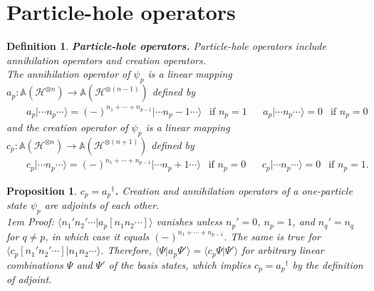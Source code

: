 \documentclass[11pt,fleqn]{article}
\newcommand{\y}{\psi}        %
\newcommand{\Y}{\Psi}        %
\newcommand{\dg}{\ensuremath{^\dagger}}
\newcommand{\cd}{\ensuremath{\cdots}}
\newcommand{\bmit}[1]{{\bfseries\itshape\mathversion{bold}#1}}
\newcommand{\mc}[1]{\ensuremath{\mathcal{#1}}}
\newcommand{\mb}[1]{\ensuremath{\mathbb{#1}}}
\newcommand{\kt}[1]{\ensuremath{|#1\rangle}}
\newcommand{\ip}[1]{\ensuremath{\langle#1\rangle}}
\theoremstyle{mystyle}
\newtheorem{dfn}{Definition}[section]
\newtheorem{pro}{Proposition}[section]
\numberwithin{equation}{section}
\begin{document}
\section{Particle-hole operators}

\begin{dfn}
\bmit{Particle-hole operators.}
\textit{Particle-hole operators} include \textit{annihilation operators} and \textit{creation operators}.\\
The \textit{annihilation operator} of $\y_p$ is a linear mapping $a_p:\mb{A}(\mc{H}^{\otimes n})\rightarrow\mb{A}(\mc{H}^{\otimes (n-1)})$ defined by
\begin{align}
&&
\label{annihilation-operator}
  a_p
  \kt{\cd n_p\cd}
=
  (-)^{n_1+\cd+n_{p-1}}
  \kt{\cd n_p-1\cd}
\ \ \text{ if $n_p=1$}
&&
  a_p\kt{\cd n_p\cd}
=
  0
\ \ \text{ if $n_p=0$}
\end{align}
and the \textit{creation operator} of $\y_p$ is a linear mapping $c_p:\mb{A}(\mc{H}^{\otimes n})\rightarrow\mb{A}(\mc{H}^{\otimes(n+1)})$ defined by
\begin{align}
\label{creation-operator}
&&
  c_p
  \kt{\cd n_p\cd}
=
  (-)^{n_1+\cd+n_{p-1}}
  \kt{\cd n_p+1\cd}
\ \ \text{ if $n_p=0$}
&&
  c_p\kt{\cd n_p\cd}
=
  0
\ \ \text{ if $n_p=1$.}
\end{align}
\end{dfn}

\begin{pro}
\label{particle-hole-adjoint-relation}
\bmit{$c_p=a_p\dg$.}
\textit{Creation and annihilation operators of a one-particle state $\y_p$ are adjoints of each other.}
\\\hangindent1em
Proof:
$\ip{n_1'n_2'\cd|a_p[n_1n_2\cd]}$
vanishes unless $n_p'=0$, $n_p=1$, and $n_q'=n_q$ for $q\neq p$, in which case it equals $(-)^{n_1+\cd+n_{p-1}}$.
The same is true for 
$\ip{c_p[n_1'n_2'\cd]|n_1n_2\cd}$.
Therefore, $\ip{\Y|a_p\Y'}=\ip{c_p\Y|\Y'}$ for arbitrary linear combinations $\Y$ and $\Y'$ of the basis states, which implies $c_p=a_p\dg$ by the definition of adjoint.
\end{pro}
\end{document}
